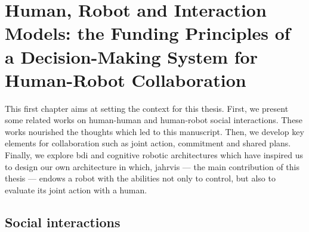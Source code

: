 \documentclass[a4paper,11pt,twoside]{StyleThese}
\begin{document}
\setcounter{chapter}{0} %
\dominitoc
\faketableofcontents
\fi

\chapter{Human, Robot and Interaction Models: the Funding Principles of a Decision-Making System for Human-Robot Collaboration}
\label{chapter:chap1}
\minitoc

This first chapter aims at setting the context for this thesis. First, we present some related works on human-human and human-robot social interactions. These works nourished the thoughts which led to this manuscript. Then, we develop key elements for collaboration such as joint action, commitment and shared plans. Finally, we explore \acrfull{bdi} and cognitive robotic architectures  which have inspired us to design our own architecture in which, \acrshort{jahrvis} —  the main contribution of this thesis — endows a robot with the abilities not only to control, but also to evaluate its joint action with a human. 


\section{Social interactions}\label{sec:soc_int}
\end{document}
